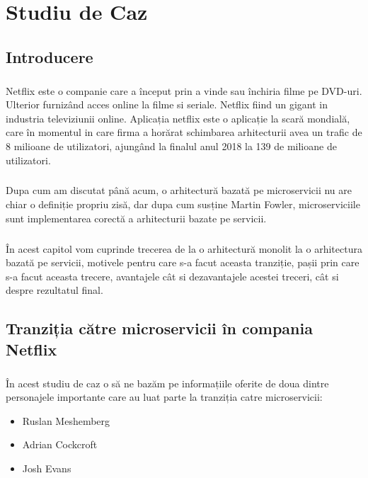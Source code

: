 \documentclass[12pt]{report}
\begin{document}
  \chapter{Studiu de Caz}
	\section{Introducere}
	\paragraph{}Netflix este o companie care a început prin a vinde sau închiria filme pe DVD-uri. Ulterior furnizând acces online la filme si seriale. Netflix fiind un gigant in industria televiziunii online. Aplicația netflix este o aplicație la scară mondială, care în momentul in care firma a horărat schimbarea arhitecturii avea un trafic de 8 milioane de utilizatori, ajungând la finalul anul 2018 la 139 de milioane de utilizatori.	
	\paragraph{}Dupa cum am discutat până acum, o arhitectură bazată pe microservicii nu are chiar o definiție propriu zisă, dar dupa cum susține Martin Fowler, microserviciile sunt implementarea corectă a arhitecturii bazate pe servicii.
	\paragraph{}În acest capitol vom cuprinde trecerea de la o arhitectură monolit la o arhitectura bazată pe servicii, motivele pentru care s-a facut aceasta tranziție, pașii prin care s-a facut aceasta trecere, avantajele cât si dezavantajele acestei treceri, cât si despre rezultatul final.
	\section{Tranziția către microservicii în compania Netflix}
	\paragraph{}În acest studiu de caz o să ne bazăm pe informațiile oferite de doua dintre personajele importante care au luat parte la tranziția catre microservicii:
	\begin{itemize}
	\item Ruslan Meshemberg
	\item Adrian Cockcroft	
	\item Josh Evans	
	\end{itemize}
\end{document}
